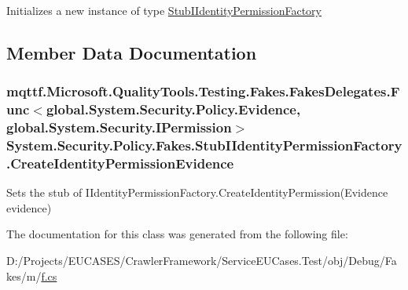 Initializes a new instance of type \hyperlink{class_system_1_1_security_1_1_policy_1_1_fakes_1_1_stub_i_identity_permission_factory}{Stub\-I\-Identity\-Permission\-Factory}



\subsection{Member Data Documentation}
\hypertarget{class_system_1_1_security_1_1_policy_1_1_fakes_1_1_stub_i_identity_permission_factory_aacee01d2569976a45b4c0920e00f2b91}{
\subsubsection[{Create\-Identity\-Permission\-Evidence}]{\setlength{\rightskip}{0pt plus 5cm}mqttf.\-Microsoft.\-Quality\-Tools.\-Testing.\-Fakes.\-Fakes\-Delegates.\-Func$<$global.\-System.\-Security.\-Policy.\-Evidence, global.\-System.\-Security.\-I\-Permission$>$ System.\-Security.\-Policy.\-Fakes.\-Stub\-I\-Identity\-Permission\-Factory.\-Create\-Identity\-Permission\-Evidence}}\label{class_system_1_1_security_1_1_policy_1_1_fakes_1_1_stub_i_identity_permission_factory_aacee01d2569976a45b4c0920e00f2b91}


Sets the stub of I\-Identity\-Permission\-Factory.\-Create\-Identity\-Permission(\-Evidence evidence)



The documentation for this class was generated from the following file\-:\begin{DoxyCompactItemize}
\item 
D\-:/\-Projects/\-E\-U\-C\-A\-S\-E\-S/\-Crawler\-Framework/\-Service\-E\-U\-Cases.\-Test/obj/\-Debug/\-Fakes/m/\hyperlink{m_2f_8cs}{f.\-cs}\end{DoxyCompactItemize}
